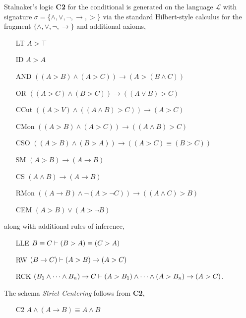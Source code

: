 \documentclass[12pt]{article}
\renewcommand{\L}{\mathcal{L}}
\begin{document}
\begin{defn}
Stalnaker's logic \textbf{C2} for the conditional is generated on the language $\L$ with signature $\sigma = \{ \wedge, \vee, \neg, \to,  > \}$ via the standard Hilbert-style calculus for the fragment $\{ \wedge, \vee, \neg, \to \}$ and additional axioms,
\begin{enumerate}
\item[LT] $A > \top$

\item[ID] $A > A$

\item[AND] $((A > B) \wedge (A > C)) \to (A > (B \wedge C))$

\item[OR] $((A > C) \wedge (B > C)) \to ((A \vee B) > C)$

\item[CCut] $((A > V) \wedge ((A \wedge B) > C)) \to (A > C)$

\item[CMon] $((A > B) \wedge (A > C)) \to ((A \wedge B) > C)$

\item[CSO] $((A > B) \wedge (B > A)) \to ((A > C) \equiv (B > C))$

\item[SM] $(A > B) \to (A \to B)$

\item[CS] $(A \wedge B) \to (A \to B)$

\item[RMon] $((A \to B) \wedge \neg(A > \neg C)) \to ((A \wedge C) > B)$

\item[CEM] $(A > B) \vee (A > \neg B)$
\end{enumerate}
along with additional rules of inference,
\begin{enumerate}
\item[LLE] $B \equiv C \vdash (B > A) \equiv (C > A)$

\item[RW] $(B \to C) \vdash (A > B) \to (A > C)$

\item[RCK] $(B_1 \wedge \dots \wedge B_n) \to C \vdash (A > B_1) \wedge \dots \wedge (A > B_n) \to (A > C)$.
\end{enumerate}
\end{defn}

\begin{lemma}
The schema \textit{Strict Centering} follows from \textbf{C2},
\begin{enumerate}
\item[C2] $A \wedge (A \to B) \equiv A \wedge B$
\end{enumerate}
\end{lemma}
\end{document}
